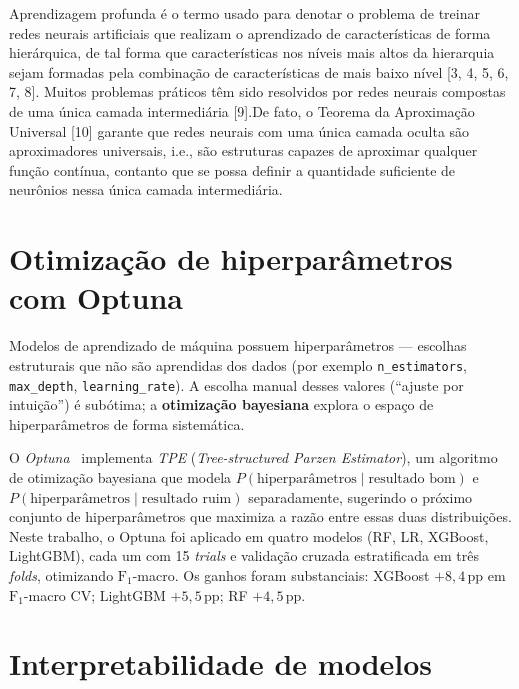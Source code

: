 \noindent
\begin{quoting}[rightmargin=0cm,leftmargin=4cm]
\begin{singlespace}
{\footnotesize
Aprendizagem profunda é o termo usado para denotar o problema de treinar redes neurais artiﬁciais que realizam o aprendizado de características de forma hierárquica, de tal forma que características nos níveis mais altos da hierarquia sejam formadas pela combinação de características de mais baixo nível [3, 4, 5, 6, 7, 8]. Muitos problemas práticos têm sido resolvidos por redes neurais compostas de uma única camada intermediária [9].De fato, o Teorema da Aproximação Universal [10] garante que redes neurais com uma única camada oculta são aproximadores universais, i.e., são estruturas capazes de aproximar qualquer função contínua, contanto que se possa deﬁnir a quantidade suﬁciente de neurônios nessa única camada intermediária. \cite[p. 58]{Barioni17}
}
\end{singlespace}
\end{quoting}

\section{Otimização de hiperparâmetros com Optuna}
\label{sec:fund_optuna}

Modelos de aprendizado de máquina possuem hiperparâmetros --- escolhas estruturais que não são aprendidas dos dados (por exemplo \texttt{n\_estimators}, \texttt{max\_depth}, \texttt{learning\_rate}). A escolha manual desses valores (``ajuste por intuição'') é subótima; a \textbf{otimização bayesiana} explora o espaço de hiperparâmetros de forma sistemática.

O \emph{Optuna}~\cite{akiba2019optuna} implementa \emph{TPE} (\emph{Tree-structured Parzen Estimator}), um algoritmo de otimização bayesiana que modela \(P(\text{hiperparâmetros} \mid \text{resultado bom})\) e \(P(\text{hiperparâmetros} \mid \text{resultado ruim})\) separadamente, sugerindo o próximo conjunto de hiperparâmetros que maximiza a razão entre essas duas distribuições. Neste trabalho, o Optuna foi aplicado em quatro modelos (RF, LR, XGBoost, LightGBM), cada um com 15 \emph{trials} e validação cruzada estratificada em três \emph{folds}, otimizando \(\text{F}_1\)-macro. Os ganhos foram substanciais: XGBoost \(+8,4\,\text{pp}\) em \(\text{F}_1\)-macro CV; LightGBM \(+5,5\,\text{pp}\); RF \(+4,5\,\text{pp}\).

\section{Interpretabilidade de modelos}
\label{sec:fund_interpretabilidade}

